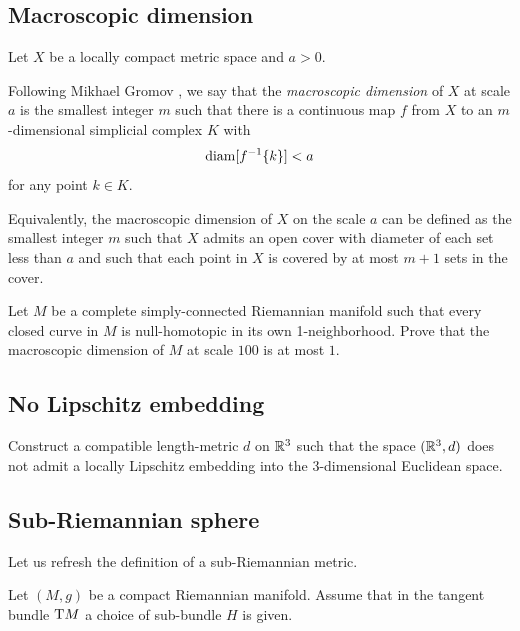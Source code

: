 \subsection*{Macroscopic dimension\easy}
\label{macroscopic dimension} 

Let $X$ be a locally compact metric space and $a>0$.

Following Mikhael Gromov \cite{gromov:macroscopic-dimension}, we say that the \emph{macroscopic dimension} of $X$ at scale $a$ is the smallest integer $m$ such that there is a continuous map $f$ from $X$ to an $m$-dimensional simplicial complex $K$ with
\[\operatorname{\rm diam}\nolimits[f^{-1}\{k\}]<a\]
for any point $k\in K$.

Equivalently, the macroscopic dimension of $X$ on the scale $a$ can be defined as the smallest integer $m$ such that $X$ admits an open cover with diameter of each set less than $a$ and such that each point in $X$ is covered by at most $m+1$ sets in the cover.

\begin{pr}
Let $M$ be a complete simply-connected Riemannian manifold such that every closed curve in $M$ is null-homotopic in its own 1-neighborhood.
Prove that the macroscopic dimension of $M$ at scale $100$ is at most $1$.
\end{pr}

\subsection*{No Lipschitz embedding\hard}
\label{weird-metric} 

\begin{pr}
Construct a compatible length-metric $d$ on $\mathbb{R}^3$ such that the space $(\mathbb{R}^3,d)$ does not admit a locally Lipschitz embedding into the 3-dimensional Euclidean space.
\end{pr}

\subsection*{Sub-Riemannian sphere\thm}
\label{sub-Riemannian} 

Let us refresh the definition of a sub-Riemannian metric.

Let $(M,g)$ be a compact Riemannian manifold.
Assume that in the tangent bundle $\mathrm{T} M$ a choice of sub-bundle $H$ is given.

